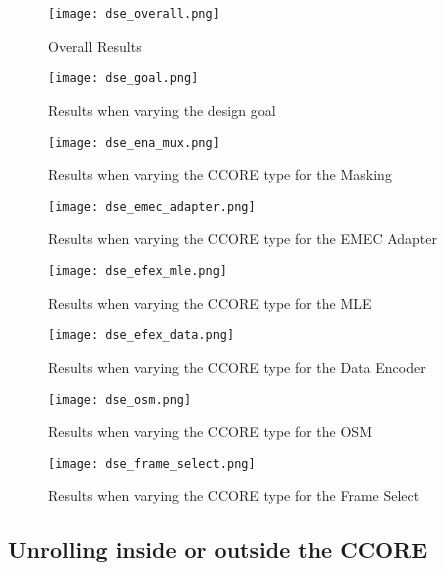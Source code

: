 \begin{figure}
    \centering
    \texttt{[image: dse\_overall.png]}
    \caption{Overall Results}
    \label{fig:dse-overall}
    \centering
    \texttt{[image: dse\_goal.png]}
    \caption{Results when varying the design goal}
    \label{fig:dse-goal}
\end{figure}
\begin{figure}
    \centering
    \texttt{[image: dse\_ena\_mux.png]}
    \caption{Results when varying the CCORE type for the Masking}
    \label{fig:dse-ena-mux}
    \centering
    \texttt{[image: dse\_emec\_adapter.png]}
    \caption{Results when varying the CCORE type for the EMEC Adapter}
    \label{fig:dse-emec-adapter}
\end{figure}
\begin{figure}
    \centering
    \texttt{[image: dse\_efex\_mle.png]}
    \caption{Results when varying the CCORE type for the MLE}
    \label{fig:dse-efex-mle}    
    \centering
    \texttt{[image: dse\_efex\_data.png]}
    \caption{Results when varying the CCORE type for the Data Encoder}
    \label{fig:dse-efex-data}
\end{figure}
\begin{figure}
    \centering
    \texttt{[image: dse\_osm.png]}
    \caption{Results when varying the CCORE type for the OSM}
    \label{fig:dse-osm}
    \centering
    \texttt{[image: dse\_frame\_select.png]}
    \caption{Results when varying the CCORE type for the Frame Select}
    \label{fig:dse-frame-select}
\end{figure}





\subsection{Unrolling inside or outside the CCORE}









